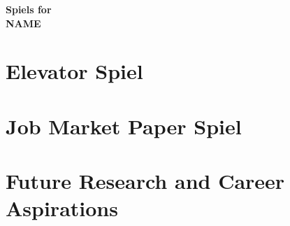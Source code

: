 \documentclass[11pt]{article}
\begin{document}
\begin{center}
{\Large {\bf Spiels for }}
\\[5pt]
{\large {\bf NAME}}
\end{center}

\vspace{.3cm}

\section{\large Elevator Spiel}   %

\section{\large Job Market Paper Spiel}   %

\section{\large Future Research and Career Aspirations}  %
\end{document}
